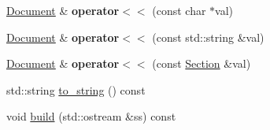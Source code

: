 \begin{DoxyCompactItemize}
\item 
\hypertarget{classlatex_1_1doc_1_1Document_a86621b9927d388202c62be1a72fcdb42}{\hyperlink{classlatex_1_1doc_1_1Document}{\-Document} \& {\bfseries operator$<$$<$} (const char $\ast$val)}\label{classlatex_1_1doc_1_1Document_a86621b9927d388202c62be1a72fcdb42}

\item 
\hypertarget{classlatex_1_1doc_1_1Document_a3bfae6320f6798f236e9d1775ab4a987}{\hyperlink{classlatex_1_1doc_1_1Document}{\-Document} \& {\bfseries operator$<$$<$} (const std\-::string \&val)}\label{classlatex_1_1doc_1_1Document_a3bfae6320f6798f236e9d1775ab4a987}

\item 
\hypertarget{classlatex_1_1doc_1_1Document_a0d011c1af57eea8b68e5aae4ed546d99}{\hyperlink{classlatex_1_1doc_1_1Document}{\-Document} \& {\bfseries operator$<$$<$} (const \hyperlink{classlatex_1_1doc_1_1Section}{\-Section} \&val)}\label{classlatex_1_1doc_1_1Document_a0d011c1af57eea8b68e5aae4ed546d99}

\item 
std\-::string \hyperlink{classlatex_1_1doc_1_1Document_ad62f7f8b1f05f3d6edb2734ba0611913}{to\-\_\-string} () const 
\item 
void \hyperlink{classlatex_1_1doc_1_1Document_a8ae50f6e90452fce2dc036b8fd30a052}{build} (std\-::ostream \&ss) const 
\end{DoxyCompactItemize}

